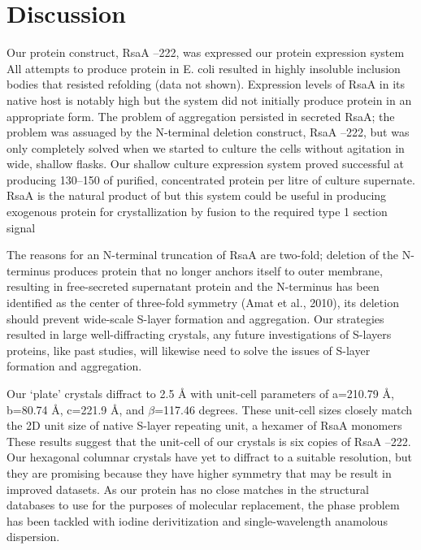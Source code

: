 \section{Discussion}\label{sec:crystal-discussion}
Our protein construct, RsaA --222, was expressed our \caulobacter protein expression system All attempts to produce protein in E. coli resulted in highly insoluble inclusion bodies that resisted refolding (data not shown). Expression levels of RsaA in its native host is notably high but the system did not initially produce protein in an appropriate form. The problem of aggregation persisted in \caulobacter secreted RsaA; the problem was assuaged by the N-terminal deletion construct, RsaA --222, but was only completely solved when we started to culture the cells without agitation in wide, shallow flasks. Our shallow culture expression system proved successful at producing 130--150 \milligram  of purified, concentrated protein per litre of culture supernate. RsaA is the natural product of \caulobacter but this system could be useful in producing exogenous protein for crystallization by fusion to the required type 1 section signal

The reasons for an N-terminal truncation of RsaA are two-fold; deletion of the N-terminus produces protein that no longer anchors itself to outer membrane, resulting in free-secreted supernatant protein and the N-terminus has been identified as the center of three-fold symmetry (Amat et al., 2010), its deletion should prevent wide-scale \ac{S-layer} formation and aggregation. Our strategies resulted in large well-diffracting crystals, any future investigations of \acp{S-layer} proteins, like past studies, will likewise need to solve the issues of \ac{S-layer} formation and aggregation.

Our `plate' crystals diffract to 2.5 \AA{} with unit-cell parameters of  a=210.79 \AA, b=80.74 \AA, c=221.9 \AA,  and $\beta$=117.46 degrees. These unit-cell sizes closely match the 2D unit size of native \ac{S-layer} repeating unit, a hexamer of RsaA monomers These results suggest that the unit-cell of our crystals is six copies of RsaA --222. Our hexagonal columnar crystals have yet to diffract to a suitable resolution, but they are promising because they have higher symmetry that may be result in improved datasets. As our protein has no close matches in the structural databases to use for the purposes of molecular replacement, the phase problem has been tackled with iodine derivitization and single-wavelength anamolous dispersion. 
 